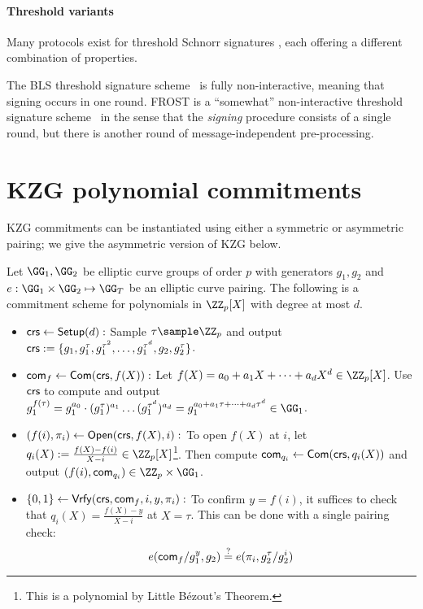 
\paragraph{Threshold variants}
Many protocols exist for threshold Schnorr signatures \cite{SAC:KomGol20,C:BCKMTZ22,EPRINT:Lindell22,EPRINT:BatLonMen22}, each offering a different combination of properties. 

 The BLS threshold signature scheme~\cite{AC:BonLynSha01} is fully non-interactive, meaning that signing occurs in one round.
FROST is a ``somewhat'' non-interactive threshold signature scheme~\cite{EPRINT:BelTesZhu22} in the sense that the \emph{signing} procedure consists of a single round, but there is another round of message-independent pre-processing.     

\section{KZG polynomial commitments}\label{sec:kzg}

KZG commitments can be instantiated using either a symmetric or asymmetric pairing; we give the asymmetric version of KZG below.

\begin{construction}
Let $\GG_1, \GG_2$ be elliptic curve groups of order $p$ with generators $g_1,g_2$ and $e: \GG_1 \times \GG_2 \mapsto \GG_T$ be an elliptic curve pairing. The following is a commitment scheme for polynomials in $\ZZ_p[X]$ with degree at most $d$.
\begin{itemize}
    \item \underline{$\mathsf{crs} \gets \mathsf{Setup}(d):$} Sample $\tau \sample \ZZ_p$ and output $\mathsf{crs} := \{g_1, g_1^\tau, g_1^{\tau^2}, \dots, g_1^{\tau^d},\allowbreak g_2, g_2^\tau\}$.
    \item \underline{$\mathsf{com}_f \gets \mathsf{Com}(\mathsf{crs}, f(X)):$} Let $f(X) = a_0 + a_1 X + \dots + a_d X^d \in \ZZ_p[X]$. Use $\mathsf{crs}$ to compute and output $g_1^{f(\tau)} = g_1^{a_0} \cdot (g_1^\tau)^{a_1} \dots (g_1^{\tau^d})^{a_d} = g_1^{a_0 + a_1 \tau + \dots + a_d \tau^d}\allowbreak \in \GG_1$.
    \item \underline{$(f(i), \pi_i) \gets \mathsf{Open}(\mathsf{crs}, f(X), i):$} To open $f(X)$ at $i$, let $q_i(X) := \frac{f(X) - f(i)}{X - i}\allowbreak \in \ZZ_p[X]$\footnote{This is a polynomial by Little Bézout's Theorem.}. Then compute $\mathsf{com}_{q_i} \gets \mathsf{Com}(\mathsf{crs}, q_i(X))$ and output $(f(i),\allowbreak \com_{q_i}) \in \ZZ_p \times \GG_1$.
    \item \underline{$\{0,1\} \gets \mathsf{Vrfy}(\mathsf{crs}, \mathsf{com}_f, i, y, \pi_i):$} To confirm $y = f(i)$, it suffices to check that $q_i(X) = \frac{f(X) - y}{X - i}$ at $X=\tau$. This can be done with a single pairing check:
    \[
        e(\mathsf{com}_f / g_1^y, g_2) \stackrel{?}{=} e(\pi_i, g_2^\tau / g_2^i)
    \]
\end{itemize}
\end{construction}

